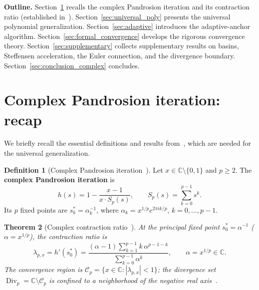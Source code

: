\documentclass[10pt,a4paper,oneside]{book}
\newtheorem{theorem}{Theorem}[chapter]
\theoremstyle{definition}
\newtheorem{definition}[theorem]{Definition}
\theoremstyle{remark}
\newcommand{\CC}{\mathbb{C}}
\DeclareMathOperator{\Div}{Div}
\begin{document}
\medskip

\textbf{Outline.}
Section~\ref{sec:complex_recap} recalls the complex Pandrosion iteration and its contraction ratio (established in~\cite{besevic2026complex}).
Section~\ref{sec:universal_poly} presents the universal polynomial generalization.
Section~\ref{sec:adaptive} introduces the adaptive-anchor algorithm.
Section~\ref{sec:formal_convergence} develops the rigorous convergence theory.
Section~\ref{sec:supplementary} collects supplementary results on basins, Steffensen acceleration, the Euler connection, and the divergence boundary.
Section~\ref{sec:conclusion_complex} concludes.

\section{Complex Pandrosion iteration: recap}
\label{sec:complex_recap}

We briefly recall the essential definitions and results from~\cite{besevic2026complex}, which are needed for the universal generalization.

\begin{definition}[Complex Pandrosion iteration~{\cite[Def.\ 2.1]{besevic2026complex}}]
\label{def:complex_pandrosion}
Let $x \in \CC \setminus \{0,1\}$ and $p \geq 2$.  The \textbf{complex Pandrosion iteration} is
\begin{equation}
  \label{eq:complex_pandrosion}
  h(s) = 1 - \frac{x-1}{x \cdot S_p(s)},
  \qquad
  S_p(s) = \sum_{k=0}^{p-1} s^k.
\end{equation}
Its $p$ fixed points are $s_k^* = \alpha_k^{-1}$, where $\alpha_k = x^{1/p} e^{2\pi ik/p}$, $k = 0,\ldots,p-1$.
\end{definition}

\begin{theorem}[Complex contraction ratio~{\cite[Thm.\ 3.1]{besevic2026complex}}]
\label{thm:complex_lambda}
At the principal fixed point $s_0^* = \alpha^{-1}$ ($\alpha = x^{1/p}$), the contraction ratio is
\begin{equation}
  \label{eq:lambda_complex}
  \lambda_{p,x} = h'(s_0^*) = \frac{(\alpha - 1)\displaystyle\sum_{k=1}^{p-1} k\,\alpha^{p-1-k}}{\displaystyle\sum_{k=0}^{p-1} \alpha^k},
  \qquad \alpha = x^{1/p} \in \CC.
\end{equation}
The convergence region is $\mathcal{C}_p = \{x \in \CC : |\lambda_{p,x}| < 1\}$; the divergence set $\Div_p = \CC \setminus \mathcal{C}_p$ is confined to a neighborhood of the negative real axis~\cite[Prop.\ 3.1]{besevic2026complex}.
\end{theorem}
\end{document}
